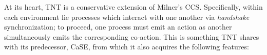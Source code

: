 \documentclass[orivec]{llncs}
\begin{document}

At its heart, TNT is a conservative extension of Milner's CCS.
Specifically, within each environment lie processes which interact with
one another via \emph{handshake} synchronization; to proceed, one
process must emit an action as another simultaneously emits the
corresponding co-action.  This is something TNT shares with its
predecessor, CaSE, from which it also acquires the following features:
\end{document}
